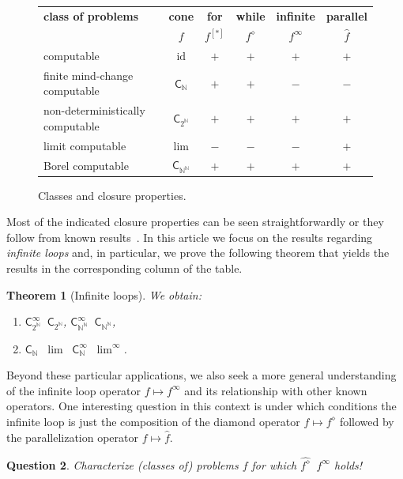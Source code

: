 \documentclass[11pt,a4paper]{amsart}
\theoremstyle{plain}
\newtheorem{thm}{Theorem}[section]
\theoremstyle{definition}
\theoremstyle{defC}
\theoremstyle{thmC}
\theoremstyle{plain}
\numberwithin{equation}{section}
\def\IN{{\mathbb{N}}}
\def\C{{\mathsf{{C}}}}
\def\C{\mathsf{C}}
\def\equivW{\mathop{\equiv_{\mathrm{W}}}}
\def\lW{\mathop{<_{\mathrm{W}}}}
\def\equivW{\mathop{\equiv_{\mathrm{W}}}}
\def\lW{\mathop{<_{\mathrm{W}}}}
\def\id{{\mathrm{id}}}
\newtheorem{question}[thm]{Question}
\begin{document}
\begin{figure}[htb]
\centering
\begin{tabular}{l|c|cccc}
{\bf class of problems} & {\bf cone} & {\bf for} & {\bf while} & {\bf infinite} & {\bf parallel}\\
& $f$ & $f^{[*]}$ & $f^\diamond$ & $f^\infty$ & $\widehat{f}$\\\hline
computable & $\id$ & $+$ & $+$ & $+$ & $+$ \\
finite mind-change computable & $\C_\IN$ & $+$ & $+$ & $-$ & $-$ \\
non-deterministically computable & $\C_{2^\IN}$ & $+$ & $+$ & $+$ & $+$ \\
limit computable & $\lim$ & $-$ & $-$ & $-$ & $+$ \\
Borel computable & $\C_{\IN^\IN}$ & $+$ & $+$ & $+$ & $+$
\end{tabular}
\caption{Classes and closure properties.}
\end{figure} 

\noindent
Most of the indicated closure properties can be seen straightforwardly or they follow from known results~\cite{BGP21}.
In this article we focus on the results regarding {\em infinite loops} and, in particular, we prove the following theorem
that yields the results in the corresponding column of the table.


\begin{thm}[Infinite loops]
\label{thm:infinite-loops}
We obtain:
\begin{enumerate}
\item $\C_{2^\IN}^\infty\equivW\C_{2^\IN}$, $\C_{\IN^\IN}^\infty\equivW\C_{\IN^\IN}$,
\item $\C_{\IN}\lW\lim\equivW\C_{\IN}^\infty\lW\lim^\infty$.
\end{enumerate}
\end{thm}


\noindent
Beyond these particular applications, we also seek a more general understanding of the infinite loop operator $f \mapsto f^\infty$ and its relationship with other known operators. One interesting question in this context is under
which conditions the infinite loop is just the composition of the diamond operator $f\mapsto f^\diamond$ 
followed by the parallelization operator $f\mapsto\widehat{f}$.

\begin{question}
\label{question}
Characterize (classes of) problems $f$ for which $\widehat{f^\diamond}\equivW f^\infty$ holds!
\end{question}
\end{document}
